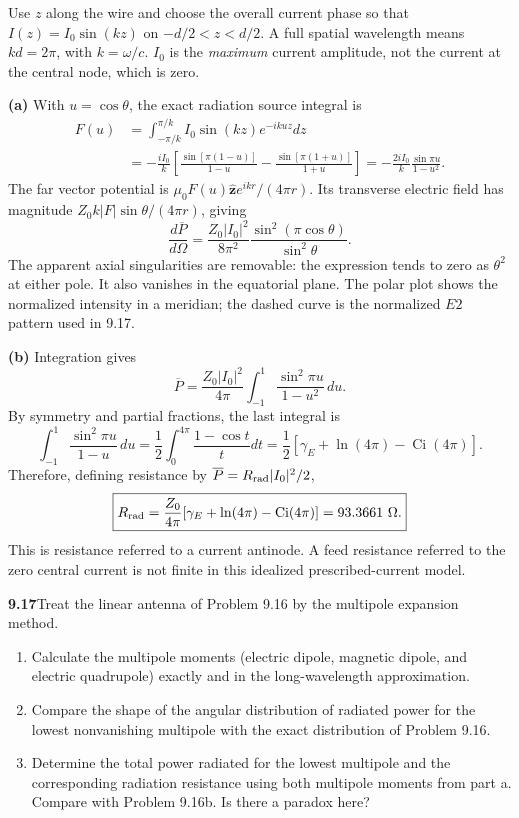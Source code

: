 Use $z$ along the wire and choose the overall current phase so that
$I(z)=I_0\sin(kz)$ on $-d/2<z<d/2$. A full spatial wavelength means
$kd=2\pi$, with $k=\omega/c$. $I_0$ is the \emph{maximum} current
amplitude, not the current at the central node, which is zero.

\textbf{(a)} With $u=\cos\theta$, the exact radiation source integral is
\begin{align*}
F(u)&=\int_{-\pi/k}^{\pi/k}I_0\sin(kz)e^{-ikuz}dz\\
&=-\frac{iI_0}{k}\left[
\frac{\sin[\pi(1-u)]}{1-u}
-\frac{\sin[\pi(1+u)]}{1+u}\right]
=-\frac{2iI_0}{k}\frac{\sin\pi u}{1-u^2}.
\end{align*}
The far vector potential is $\mu_0F(u)\hat{\mathbf z}e^{ikr}/(4\pi r)$.
Its transverse electric field has magnitude
$Z_0k|F|\sin\theta/(4\pi r)$, giving
\[
\boxed{\frac{d\overline P}{d\Omega}
=\frac{Z_0|I_0|^2}{8\pi^2}
\frac{\sin^2(\pi\cos\theta)}{\sin^2\theta}.}
\]
The apparent axial singularities are removable: the expression tends
to zero as $\theta^2$ at either pole. It also vanishes in the equatorial
plane. The polar plot shows the normalized intensity in a meridian;
the dashed curve is the normalized $E2$ pattern used in 9.17.
\begin{center}\end{center}

\textbf{(b)} Integration gives
\[
\overline P=\frac{Z_0|I_0|^2}{4\pi}
\int_{-1}^{1}\frac{\sin^2\pi u}{1-u^2}\,du.
\]
By symmetry and partial fractions, the last integral is
\[
\int_{-1}^1\frac{\sin^2\pi u}{1-u}\,du
=\frac12\int_0^{4\pi}\frac{1-\cos t}{t}dt
=\frac12[\gamma_E+\ln(4\pi)-\operatorname{Ci}(4\pi)].
\]
Therefore, defining resistance by $\overline P=R_{\rm rad}|I_0|^2/2$,
\[
\boxed{R_{\rm rad}=\frac{Z_0}{4\pi}
[\gamma_E+\ln(4\pi)-\operatorname{Ci}(4\pi)]
=93.3661\ \Omega.}
\]
This is resistance referred to a current antinode. A feed resistance
referred to the zero central current is not finite in this idealized
prescribed-current model.

\par\bigskip
\noindent\textbf{9.17}\quad Treat the linear antenna of Problem 9.16 by the multipole expansion method.
\begin{enumerate}
\item[(a)] Calculate the multipole moments (electric dipole, magnetic dipole, and electric quadrupole) exactly and in the long-wavelength approximation.
\item[(b)] Compare the shape of the angular distribution of radiated power for the lowest nonvanishing multipole with the exact distribution of Problem 9.16.
\item[(c)] Determine the total power radiated for the lowest multipole and the corresponding radiation resistance using both multipole moments from part a. Compare with Problem 9.16b. Is there a paradox here?
\end{enumerate}
\solution

